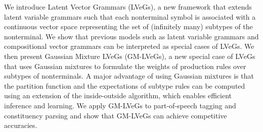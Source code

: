 We introduce Latent Vector Grammars (LVeGs), a new framework that extends latent variable grammars such that each nonterminal symbol is associated with a continuous vector space representing the set of (infinitely many) subtypes of the nonterminal. We show that previous models such as latent variable grammars and compositional vector grammars can be interpreted as special cases of LVeGs. We then present Gaussian Mixture LVeGs (GM-LVeGs), a new special case of LVeGs that uses Gaussian mixtures to formulate the weights of production rules over subtypes of nonterminals. A major advantage of using Gaussian mixtures is that the partition function and the expectations of subtype rules can be computed using an extension of the inside-outside algorithm, which enables efficient inference and learning. We apply GM-LVeGs to part-of-speech tagging and constituency parsing and show that GM-LVeGs can achieve competitive accuracies.
